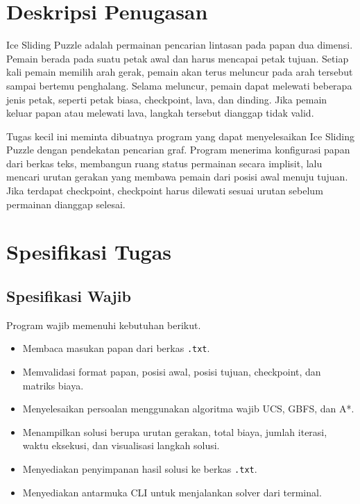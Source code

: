 \section{Deskripsi Penugasan}\label{sec:Pendahuluan}

Ice Sliding Puzzle adalah permainan pencarian lintasan pada papan dua
dimensi. Pemain berada pada suatu petak awal dan harus mencapai petak
tujuan. Setiap kali pemain memilih arah gerak, pemain akan terus
meluncur pada arah tersebut sampai bertemu penghalang. Selama
meluncur, pemain dapat melewati beberapa jenis petak, seperti petak
biasa, checkpoint, lava, dan dinding. Jika pemain keluar papan atau
melewati lava, langkah tersebut dianggap tidak valid.

Tugas kecil ini meminta dibuatnya program yang dapat menyelesaikan
Ice Sliding Puzzle dengan pendekatan pencarian graf. Program menerima
konfigurasi papan dari berkas teks, membangun ruang status permainan
secara implisit, lalu mencari urutan gerakan yang membawa pemain dari
posisi awal menuju tujuan. Jika terdapat checkpoint, checkpoint harus
dilewati sesuai urutan sebelum permainan dianggap selesai.

\section{Spesifikasi Tugas}\label{sec:Spesifikasi Tugas}

\subsection{Spesifikasi Wajib}\label{sub:Spesifikasi Wajib}

Program wajib memenuhi kebutuhan berikut.
\begin{itemize}[label=\textbullet]
    \item Membaca masukan papan dari berkas \texttt{.txt}.
    \item Memvalidasi format papan, posisi awal, posisi tujuan,
        checkpoint, dan matriks biaya.
    \item Menyelesaikan persoalan menggunakan algoritma wajib UCS,
        GBFS, dan A*.
    \item Menampilkan solusi berupa urutan gerakan, total biaya,
        jumlah iterasi, waktu eksekusi, dan visualisasi langkah solusi.
    \item Menyediakan penyimpanan hasil solusi ke berkas
        \texttt{.txt}.
    \item Menyediakan antarmuka CLI untuk menjalankan solver dari terminal.
\end{itemize}


